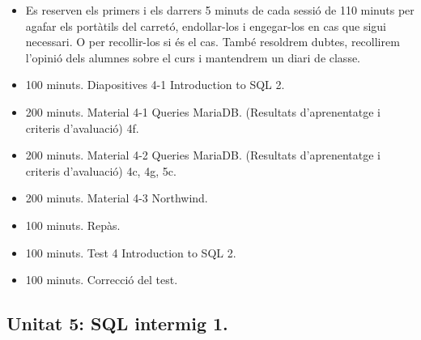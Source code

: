 \documentclass[catalan, a4paper, 12pt, titlepage]{article}
\begin{document}
  \begin{itemize}
          \item Es reserven els primers i els darrers 5 minuts de cada sessió de 110 minuts per agafar els portàtils del carretó, endollar-los i engegar-los en cas que sigui necessari. O per recollir-los si és el cas. També resoldrem dubtes, recollirem l'opinió dels alumnes sobre el curs i mantendrem un diari de classe.
	  \item 100 minuts. Diapositives 4-1 Introduction to SQL 2.
	  \item 200 minuts. Material 4-1 Queries MariaDB. (\faGraduationCap Resultats d'aprenentatge i criteris d'avaluació) 4f.
	  \item 200 minuts. Material 4-2 Queries MariaDB. (\faGraduationCap Resultats d'aprenentatge i criteris d'avaluació) 4c, 4g, 5c.
	  \item 200 minuts. Material 4-3 Northwind.
	  \item 100 minuts. Repàs.
	  \item 100 minuts. Test 4 Introduction to SQL 2.
	  \item 100 minuts. Correcció del test.
  \end{itemize}

  \subsection{Unitat 5: SQL intermig 1.}
  
\end{document}
